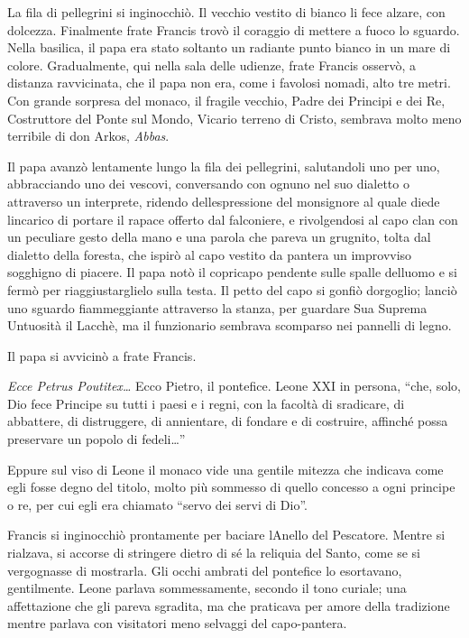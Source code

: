 La fila di pellegrini si inginocchiò. Il vecchio vestito di bianco li
fece alzare, con dolcezza. Finalmente frate Francis trovò il coraggio di
mettere a fuoco lo sguardo. Nella basilica, il papa era stato soltanto
un radiante punto bianco in un mare di colore. Gradualmente, qui nella
sala delle udienze, frate Francis osservò, a distanza ravvicinata, che
il papa non era, come i favolosi nomadi, alto tre metri. Con grande
sorpresa del monaco, il fragile vecchio, Padre dei Principi e dei Re,
Costruttore del Ponte sul Mondo, Vicario terreno di Cristo, sembrava
molto meno terribile di don Arkos, \emph{Abbas}.

Il papa avanzò lentamente lungo la fila dei pellegrini, salutandoli uno
per uno, abbracciando uno dei vescovi, conversando con ognuno nel suo
dialetto o attraverso un interprete, ridendo
dell\textquotesingle espressione del monsignore al quale diede
l\textquotesingle incarico di portare il rapace offerto dal falconiere,
e rivolgendosi al capo clan con un peculiare gesto della mano e una
parola che pareva un grugnito, tolta dal dialetto della foresta, che
ispirò al capo vestito da pantera un improvviso sogghigno di piacere. Il
papa notò il copricapo pendente sulle spalle dell\textquotesingle uomo e
si fermò per riaggiustarglielo sulla testa. Il petto del capo si gonfiò
d\textquotesingle orgoglio; lanciò uno sguardo fiammeggiante attraverso
la stanza, per guardare Sua Suprema Untuosità il Lacchè, ma il
funzionario sembrava scomparso nei pannelli di legno.

Il papa si avvicinò a frate Francis.

\emph{Ecce Petrus Poutitex\ldots{}} Ecco Pietro, il pontefice. Leone XXI
in persona, ``che, solo, Dio fece Principe su tutti i paesi e i regni,
con la facoltà di sradicare, di abbattere, di distruggere, di
annientare, di fondare e di costruire, affinché possa preservare un
popolo di fedeli\ldots''

Eppure sul viso di Leone il monaco vide una gentile mitezza che indicava
come egli fosse degno del titolo, molto più sommesso di quello concesso
a ogni principe o re, per cui egli era chiamato ``servo dei servi di
Dio''.

Francis si inginocchiò prontamente per baciare l\textquotesingle Anello
del Pescatore. Mentre si rialzava, si accorse di stringere dietro di sé
la reliquia del Santo, come se si vergognasse di mostrarla. Gli occhi
ambrati del pontefice lo esortavano, gentilmente. Leone parlava
sommessamente, secondo il tono curiale; una affettazione che gli pareva
sgradita, ma che praticava per amore della tradizione mentre parlava con
visitatori meno selvaggi del capo-pantera.

